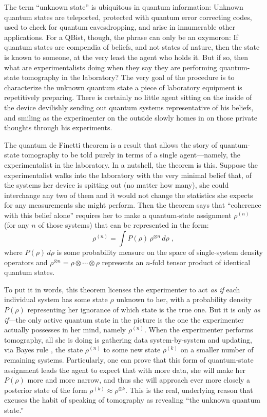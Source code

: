 \documentclass[aps,pra,superscriptaddress,12pt,tightenlines,nofootinbib]{revtex4-2}
\begin{document}
The term ``unknown state'' is ubiquitous in quantum information:  Unknown quantum states are teleported, protected with quantum error correcting codes, used to check for quantum eavesdropping, and arise in innumerable other applications.  For a QBist, though, the phrase can only be an oxymoron:  If quantum states are compendia of beliefs, and not states of nature, then the state is known to someone, at the very least the agent who holds it.  But if so, then what are experimentalists doing when they say they are performing quantum-state tomography in the laboratory?  The very goal of the procedure is to characterize the unknown quantum state a piece of laboratory equipment is repetitively preparing. There is certainly no little agent sitting on the inside of the device devilishly sending out quantum systems representative of his beliefs, and smiling as the experimenter on the outside slowly homes in on those private thoughts through his experiments.

The quantum de Finetti theorem is a result that allows the story of quantum-state tomography to be told purely in terms of a single agent---namely, the experimentalist in the laboratory.  In a nutshell, the theorem is this.  Suppose the experimentalist walks into the laboratory with the very minimal belief that, of the systems her device is spitting out (no matter how many), she could interchange any two of them and it would not change the statistics she expects for any measurements she might perform.  Then the theorem says that ``coherence with this belief alone'' requires her to make a quantum-state assignment $\rho^{(n)}$ (for any $n$ of those systems) that can be represented in the form:
\begin{equation}
\rho^{(n)}=\int P(\rho)\, \rho^{\otimes n}\, d\rho\;,
\label{MushuPork}
\end{equation}
where $P(\rho)\, d\rho$ is some probability measure on the space of single-system density operators and $\rho^{\otimes n}=\rho\otimes\cdots\otimes\rho$ represents an $n$-fold tensor product of identical quantum states.

To put it in words, this theorem licenses the experimenter to act {\it as if\/} each individual system has some state $\rho$ unknown to her, with a probability density $P(\rho)$ representing her ignorance of which state is the true one.  But it is only {\it as if}---the only active quantum state in the picture is the one the experimenter actually possesses in her mind, namely $\rho^{(n)}$.  When the experimenter performs tomography, all she is doing is gathering data system-by-system and updating, via Bayes rule \cite{Schack01}, the state $\rho^{(n)}$ to some new state $\rho^{(k)}$ on a smaller number of remaining systems. Particularly, one can prove that this form of quantum-state assignment leads the agent to expect that with more data, she will make her $P(\rho)$ more and more narrow, and thus she will approach ever more closely a posterior state of the form $\rho^{(k)}\approx \rho^{\otimes k}$.  This is the real, underlying reason that excuses the habit of speaking of tomography as revealing ``the unknown quantum state.''
\end{document}
